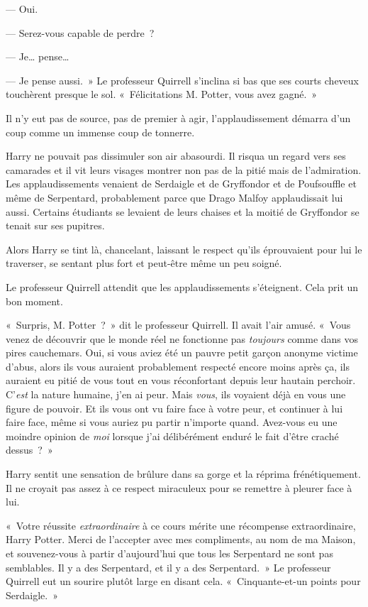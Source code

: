 --- Oui.

--- Serez-vous capable de perdre~?

--- Je… pense…

--- Je pense aussi.~» Le professeur Quirrell s'inclina si bas que ses courts cheveux touchèrent presque le sol. «~Félicitations M. Potter, vous avez gagné.~»

Il n'y eut pas de source, pas de premier à agir, l'applaudissement démarra d'un coup comme un immense coup de tonnerre.

Harry ne pouvait pas dissimuler son air abasourdi. Il risqua un regard vers ses camarades et il vit leurs visages montrer non pas de la pitié mais de l'admiration. Les applaudissements venaient de Serdaigle et de Gryffondor et de Poufsouffle et même de Serpentard, probablement parce que Drago Malfoy applaudissait lui aussi. Certains étudiants se levaient de leurs chaises et la moitié de Gryffondor se tenait sur ses pupitres.

Alors Harry se tint là, chancelant, laissant le respect qu'ils éprouvaient pour lui le traverser, se sentant plus fort et peut-être même un peu soigné.

Le professeur Quirrell attendit que les applaudissements s'éteignent. Cela prit un bon moment.

«~Surpris, M. Potter~?~» dit le professeur Quirrell. Il avait l'air amusé. «~Vous venez de découvrir que le monde réel ne fonctionne pas \emph{toujours} comme dans vos pires cauchemars. Oui, si vous aviez été un pauvre petit garçon anonyme victime d'abus, alors ils vous auraient probablement respecté encore moins après ça, ils auraient eu pitié de vous tout en vous réconfortant depuis leur hautain perchoir. C'\emph{est} la nature humaine, j'en ai peur. Mais \emph{vous}, ils voyaient déjà en vous une figure de pouvoir. Et ils vous ont vu faire face à votre peur, et continuer à lui faire face, même si vous auriez pu partir n'importe quand. Avez-vous eu une moindre opinion de \emph{moi} lorsque j'ai délibérément enduré le fait d'être craché dessus~?~»

Harry sentit une sensation de brûlure dans sa gorge et la réprima frénétiquement. Il ne croyait pas assez à ce respect miraculeux pour se remettre à pleurer face à lui.

«~Votre réussite \emph{extraordinaire} à ce cours mérite une récompense extraordinaire, Harry Potter. Merci de l'accepter avec mes compliments, au nom de ma Maison, et souvenez-vous à partir d'aujourd'hui que tous les Serpentard ne sont pas semblables. Il y a des Serpentard, et il y a des Serpentard.~» Le professeur Quirrell eut un sourire plutôt large en disant cela. «~Cinquante-et-un points pour Serdaigle.~»

